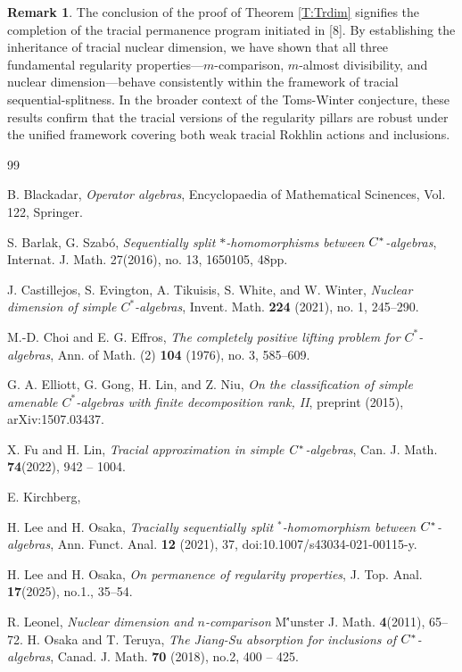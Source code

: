 \documentclass[12pt]{amsart}
\theoremstyle{plain}
\theoremstyle{definition}
\newtheorem{rem}[thm]{Remark}
\numberwithin{equation}{section}
\begin{document}
\begin{rem}
The conclusion of the proof of Theorem \ref{T:Trdim} signifies the completion of the tracial permanence program initiated in [8]. By establishing the inheritance of tracial nuclear dimension, we have shown that all three fundamental regularity properties—$m$-comparison, $m$-almost divisibility, and nuclear dimension—behave consistently within the framework of tracial sequential-splitness. In the broader context of the Toms-Winter conjecture, these results confirm that the tracial versions of the regularity pillars are robust under the unified framework covering both weak tracial Rokhlin actions and inclusions.
\end{rem} 

\begin{thebibliography}{99}

 B. Blackadar, \emph{Operator algebras}, Encyclopaedia of Mathematical Scinences, Vol. 122,  Springer.

 S. Barlak, G. Szab\'{o}, \emph{Sequentially split $*$-homomorphisms between $C\sp*$-algebras}, Internat. J. Math.  27(2016), no. 13, 1650105, 48pp.

 J. Castillejos, S. Evington, A. Tikuisis, S. White, and W. Winter, \emph{Nuclear dimension of simple $C^*$-algebras}, Invent. Math. \textbf{224} (2021), no. 1, 245–290.

 M.-D. Choi and E. G. Effros, \emph{The completely positive lifting problem for $C^*$-algebras}, Ann. of Math. (2) \textbf{104} (1976), no. 3, 585–609.

G. A. Elliott, G. Gong, H. Lin, and Z. Niu, \emph{On the classification of simple amenable $C^*$-algebras with finite decomposition rank, II}, preprint (2015), arXiv:1507.03437.

 X. Fu and H. Lin, \emph{Tracial approximation in simple $C\sp*$-algebras}, Can. J. Math. {\bf 74}(2022), 942 -- 1004.

 E. Kirchberg, \emph{}

 H. Lee and H. Osaka, \emph{Tracially sequentially split $^*$-homomorphism between $C\sp*$-algebras}, Ann. Funct. Anal.  {\bf12} (2021), 37, doi:10.1007/s43034-021-00115-y.

H. Lee and H. Osaka, \emph{On permanence of regularity properties}, J. Top. Anal. {\bf 17}(2025), no.1., 35--54.  

R. Leonel, \emph{Nuclear dimension and $n$-comparison} 
M\''unster J. Math. {\bf 4}(2011), 65--72. 
 H. Osaka and T. Teruya,  \emph{The Jiang-Su absorption for inclusions of $C\sp*$-algebras},  Canad. J. Math.  {\bf 70} (2018), no.2, 400 -- 425.


\end{thebibliography}
\end{document}
